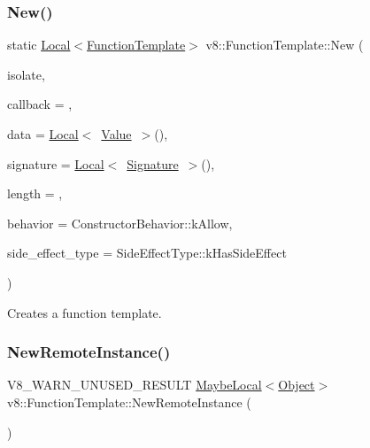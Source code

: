 \subsubsection{\texorpdfstring{New()}{New()}}
{\footnotesize\ttfamily static \mbox{\hyperlink{classv8_1_1Local}{Local}}$<$\mbox{\hyperlink{classv8_1_1FunctionTemplate}{Function\+Template}}$>$ v8\+::\+Function\+Template\+::\+New (\begin{DoxyParamCaption}\item[{\mbox{\hyperlink{classv8_1_1Isolate}{Isolate}} $\ast$}]{isolate,  }\item[{Function\+Callback}]{callback = {},  }\item[{\mbox{\hyperlink{classv8_1_1Local}{Local}}$<$ \mbox{\hyperlink{classv8_1_1Value}{Value}} $>$}]{data = {\ttfamily \mbox{\hyperlink{classv8_1_1Local}{Local}}$<$~\mbox{\hyperlink{classv8_1_1Value}{Value}}~$>$()},  }\item[{\mbox{\hyperlink{classv8_1_1Local}{Local}}$<$ \mbox{\hyperlink{classv8_1_1Signature}{Signature}} $>$}]{signature = {\ttfamily \mbox{\hyperlink{classv8_1_1Local}{Local}}$<$~\mbox{\hyperlink{classv8_1_1Signature}{Signature}}~$>$()},  }\item[{int}]{length = {},  }\item[{Constructor\+Behavior}]{behavior = {\ttfamily ConstructorBehavior\+:\+:kAllow},  }\item[{\mbox{\hyperlink{namespacev8_a29711319c2b9fc7716d65faee2f7b9cb}{Side\+Effect\+Type}}}]{side\+\_\+effect\+\_\+type = {\ttfamily SideEffectType\+:\+:kHasSideEffect} }\end{DoxyParamCaption})\hspace{0.3cm}{\ttfamily [static]}}

Creates a function template. \mbox{\label{classv8_1_1FunctionTemplate_a06fffd3d45d4f2f1aec8df075961af59}} 
\subsubsection{\texorpdfstring{New\+Remote\+Instance()}{NewRemoteInstance()}}
{\footnotesize\ttfamily V8\+\_\+\+W\+A\+R\+N\+\_\+\+U\+N\+U\+S\+E\+D\+\_\+\+R\+E\+S\+U\+LT \mbox{\hyperlink{classv8_1_1MaybeLocal}{Maybe\+Local}}$<$\mbox{\hyperlink{classv8_1_1Object}{Object}}$>$ v8\+::\+Function\+Template\+::\+New\+Remote\+Instance (\begin{DoxyParamCaption}{ }\end{DoxyParamCaption})}

